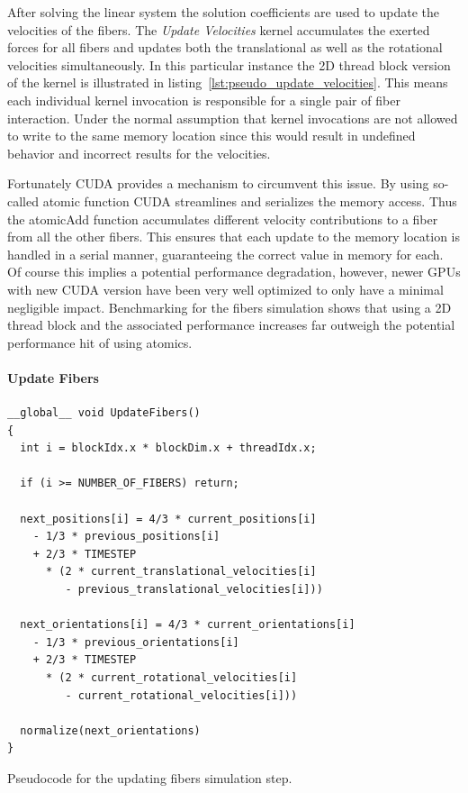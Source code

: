 \documentclass[a4paper,11pt]{kth-mag}
\begin{document}
After solving the linear system the solution coefficients are used to update the velocities of the fibers. The \emph{Update Velocities} kernel accumulates the exerted forces for all fibers and updates both the translational as well as the rotational velocities simultaneously. In this particular instance the 2D thread block version of the kernel is illustrated in listing~\ref{lst:pseudo_update_velocities}. This means each individual kernel invocation is responsible for a single pair of fiber interaction. Under the normal assumption that kernel invocations are not allowed to write to the same memory location since this would result in undefined behavior and incorrect results for the velocities.

Fortunately CUDA provides a mechanism to circumvent this issue. By using so-called atomic function CUDA streamlines and serializes the memory access. Thus the atomicAdd function accumulates different velocity contributions to a fiber from all the other fibers. This ensures that each update to the memory location is handled in a serial manner, guaranteeing the correct value in memory for each. Of course this implies a potential performance degradation, however, newer GPUs with new CUDA version have been very well optimized to only have a minimal negligible impact. Benchmarking for the fibers simulation shows that using a 2D thread block and the associated performance increases far outweigh the potential performance hit of using atomics.

\paragraph{Update Fibers}

\begin{listing}[!htbp]
  \centering
  \begin{verbatim}
__global__ void UpdateFibers()
{
  int i = blockIdx.x * blockDim.x + threadIdx.x;

  if (i >= NUMBER_OF_FIBERS) return;

  next_positions[i] = 4/3 * current_positions[i]
    - 1/3 * previous_positions[i]
    + 2/3 * TIMESTEP
      * (2 * current_translational_velocities[i]
         - previous_translational_velocities[i]))

  next_orientations[i] = 4/3 * current_orientations[i]
    - 1/3 * previous_orientations[i]
    + 2/3 * TIMESTEP
      * (2 * current_rotational_velocities[i]
         - current_rotational_velocities[i]))

  normalize(next_orientations)
}
  \end{verbatim}
  \caption{Pseudocode for the updating fibers simulation step.}
  \label{lst:pseudo_update_fibers}
\end{listing}
\end{document}

